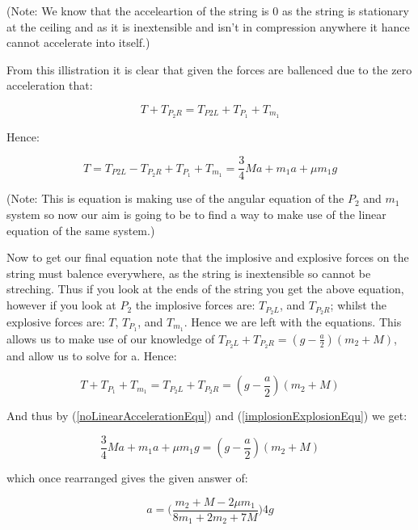 \documentclass[12pt]{article}
\begin{document}
    (Note: We know that the acceleartion of the string is \(0\) as the string is stationary at the ceiling and as it is inextensible and isn't in compression anywhere it hance cannot accelerate into itself.)

    \vspace{12pt}

    From this illistration it is clear that given the forces are ballenced due to the zero acceleration that:

    \[T+T_{P_2R}=T_{P2L}+T_{P_1}+T_{m_1}\]

    Hence:
    
    \begin{equation}
        \label{noLinearAccelerationEqu}
        T=T_{P2L}-T_{P_2R}+T_{P_1}+T_{m_1}=\frac{3}{4}Ma+m_1a+\mu m_1 g
    \end{equation}

    (Note: This is equation is making use of the angular equation of the \(P_2\) and \(m_1\) system so now our aim is going to be to find a way to make use of the linear equation of the same system.)
    
    \vspace{12pt}
    
    Now to get our final equation note that the implosive and explosive forces on the string must balence everywhere, as the string is inextensible so cannot be streching. Thus if you look at the ends of the string you get the above equation, however if you look at \(P_2\) the implosive forces are: \(T_{P_2L}\), and \(T_{P_2R}\); whilst the explosive forces are: \(T\), \(T_{P_1}\), and \(T_{m_1}\). Hence we are left with the equations. This allows us to make use of our knowledge of \( T_{P_2L}+T_{P_2R}=(g-\frac{a}{2})(m_2+M)\), and allow us to solve for a. Hence:

    \begin{equation}
        \label{implosionExplosionEqu}
        T+T_{P_1}+T_{m_1}=T_{P_2L}+T_{P_2R}=(g-\frac{a}{2})(m_2+M)
    \end{equation}

    And thus by (\ref{noLinearAccelerationEqu}) and (\ref{implosionExplosionEqu}) we get:

    \begin{equation*}
        \frac{3}{4}Ma+m_1a+\mu m_1 g=(g-\frac{a}{2})(m_2+M)
    \end{equation*}

    which once rearranged gives the given answer of:

    \begin{equation*}
        a=\Bigg(\frac{m_2+M-2\mu m_1}{8m_1+2m_2+7M}\Bigg)4g
    \end{equation*}    
\end{document}
